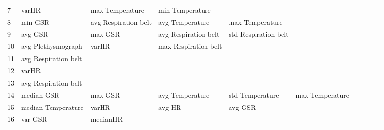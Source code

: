\begin{landscape}
\begin{table}[]
\begin{tabular}{l|llllllll}
7        & varHR                   & max Temperature       & min Temperature         &                         &                         &                       &                      &          &                      &        \\
8        & min GSR                 & avg Respiration belt  & avg Temperature         & max Temperature         &                         &                       &                      &          &                      &        \\
9        & avg GSR                 & max GSR               & avg Respiration belt    & std Respiration belt    &                         &                       &                      &          &                      &        \\
10       & avg Plethysmograph      & varHR                 & max Respiration belt    &                         &                         &                       &                      &          &                      &        \\
11       & avg Respiration belt    &                       &                         &                         &                         &                       &                      &          &                      &        \\
12       & varHR                   &                       &                         &                         &                         &                       &                      &          &                      &        \\
13       & avg Respiration belt    &                       &                         &                         &                         &                       &                      &          &                      &        \\
14       & median GSR              & max GSR               & avg Temperature         & std Temperature         & max Temperature         &                       &                      &          &                      &        \\
15       & median Temperature      & varHR                 & avg HR                  & avg GSR                 &                         &                       &                      &          &                      &        \\
16       & var GSR                 & medianHR              &                         &                         &                         &                       &                      &          &                      &        \\

\end{tabular}
\end{table}
\end{landscape}
